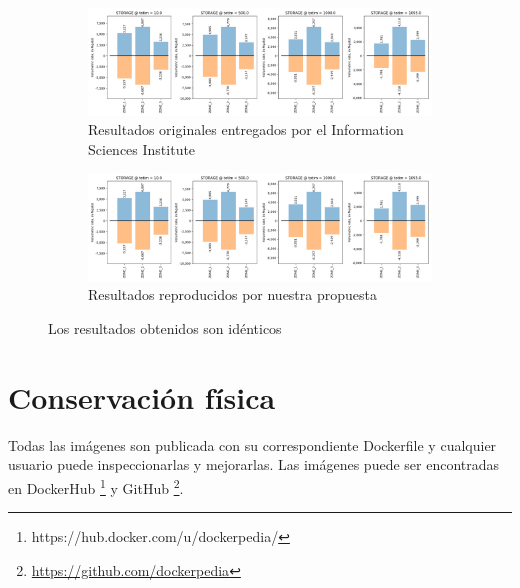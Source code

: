 \begin{figure}[t]
    \centering
    \begin{subfigure}[b]{\textwidth}
         \centering
         \includegraphics[width=\textwidth]{Figures/viz-original}
         \caption[Resultados workflow originales: ModFlow]{Resultados originales entregados por el Information Sciences Institute}
         \label{fig:modflow-original}
     \end{subfigure}
	
	    \begin{subfigure}[b]{\textwidth}
         \centering
         \includegraphics[width=\textwidth]{Figures/viz-reproduced}
        \caption[Resultados workflow reproducidos: ModFlow]{Resultados reproducidos por nuestra propuesta}
         \label{fig:modflow-reproduced}
     \end{subfigure}
        \caption[Comparación resultados MODFLOW-NEW]{Los resultados obtenidos son idénticos}
        \label{fig:both-modflow}
\end{figure}






\section{Conservación física}\label{s5.2}

Todas las imágenes son publicada con su correspondiente Dockerfile y cualquier usuario puede inspeccionarlas y mejorarlas. Las imágenes puede ser encontradas en DockerHub \footnote{https://hub.docker.com/u/dockerpedia/} y GitHub \footnote{\url{https://github.com/dockerpedia}}. 

